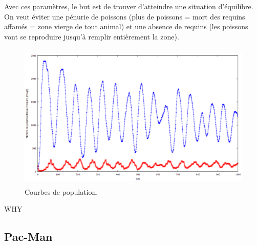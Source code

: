 \documentclass[a4paper]{article}
\begin{document}
\medskip
Avec ces paramètres, le but est de trouver d'atteindre une situation d'équilibre. On veut éviter une pénurie de poissons (plus de poissons = mort des requins affamés = zone vierge de tout animal) et une absence de requins (les poissons vont se reproduire jusqu'à remplir entièrement la zone).

 
\begin{figure}[!h]
\centering
\includegraphics[height=7cm]{1000tours.png}
\caption{Courbes de population.}
\end{figure}

WHY
\subsection{Pac-Man}
\end{document}
